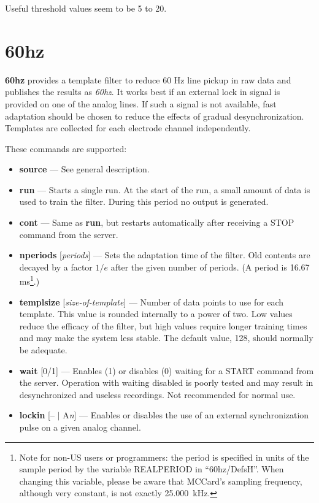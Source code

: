 \documentclass[12pt,oneside]{book}
\def\prog#1{{\bf #1}}
\def\cmd#1{{\bf #1}}
\def\arg#1{{\it #1}}
\def\stream#1{{\it #1}\xspace}
\begin{document}
Useful threshold values seem to be 5 to 20.

\section{60hz}

\prog{60hz} provides a template filter to reduce 60 Hz line pickup in
raw data and publishes the results as \stream{60hz}. It works best if
an external lock in signal is provided on one of the analog lines. If
such a signal is not available, fast adaptation should be chosen to
reduce the effects of gradual desynchronization. Templates are
collected for each electrode channel independently.

These commands are supported:

\begin{itemize}
\item \cmd{source} --- See general description.
\item \cmd{run} --- Starts a single run. At the start of the run, a
small amount of data is used to train the filter. During this period
no output is generated.
\item \cmd{cont} --- Same as \cmd{run}, but restarts automatically after
receiving a STOP command from the server.
\item \cmd{nperiods} [\arg{periods}] --- Sets the adaptation time of the
filter. Old contents are decayed by a factor $1/e$ after the given
number of periods. (A period is 16.67 ms\footnote{Note for non-US
users or programmers: the period is specified in units of the sample
period by the variable REALPERIOD in ``60hz/Defs\.H''. When changing
this variable, please be aware that
MCCard's sampling frequency, although very constant, is 
not exactly 25.000~kHz.}.)
\item \cmd{templsize} [\arg{size-of-template}] --- Number of data points to
use for each template. This value is rounded internally to a power of
two. Low values reduce the efficacy of the filter, but high values
require longer training times and may make the system less stable. The
default value, 128, should normally be adequate.
\item \cmd{wait} [0/1] --- Enables (1) or disables (0) waiting for a
START command from the server. Operation with waiting disabled is
poorly tested and may result in desynchronized and useless recordings.
Not recommended for normal use.
\item \cmd{lockin} [-- $|$ A\arg{n}] --- Enables or disables the
use of an external synchronization pulse on a given analog channel.

\end{itemize}
\end{document}
